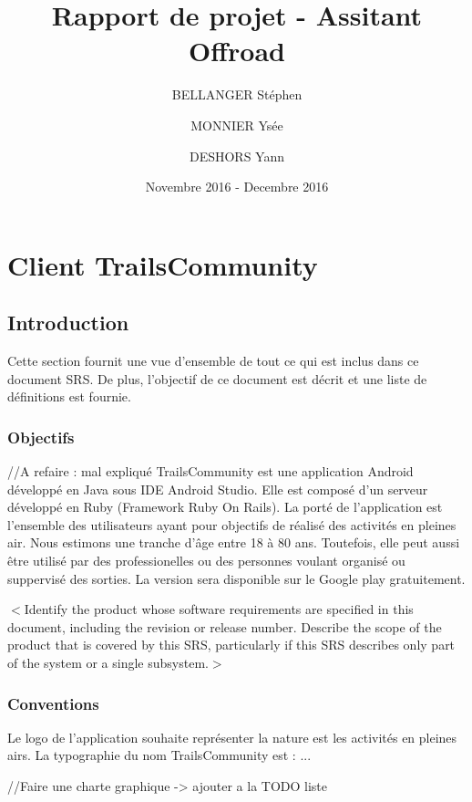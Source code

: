 \documentclass[titlepage, 12pt]{report}
\title{Rapport de projet - Assitant Offroad}
\author{BELLANGER Stéphen \and
			MONNIER Ysée \and
			DESHORS Yann}
\date{Novembre 2016 - Decembre 2016}
\begin{document}
	
\maketitle

\tableofcontents

\listoffigures 

\part{Client TrailsCommunity}

\chapter{Introduction}

Cette section fournit  une vue d'ensemble de tout ce qui est inclus dans ce document SRS. De plus, l'objectif de ce document est décrit et une liste de définitions est fournie.

\section{Objectifs}

//A refaire : mal expliqué
TrailsCommunity est une application Android développé en Java sous IDE Android Studio. Elle est composé d'un serveur développé en Ruby (Framework Ruby On Rails).
La porté de l'application est l'ensemble des utilisateurs ayant pour objectifs de réalisé des activités en pleines air. Nous estimons une tranche d'âge entre 18 à 80 ans.
Toutefois, elle peut aussi être utilisé par des professionelles ou des personnes voulant organisé ou suppervisé des sorties.
La version sera disponible sur le Google play gratuitement. 

$<$Identify the product whose software requirements are specified in this 
document, including the revision or release number. Describe the scope of the 
product that is covered by this SRS, particularly if this SRS describes only 
part of the system or a single subsystem.$>$

\section{Conventions}

Le logo de l'application souhaite représenter la nature est les activités en pleines airs. 
La typographie du nom TrailsCommunity est : ...

//Faire une charte graphique -> ajouter a la TODO liste
\end{document}

